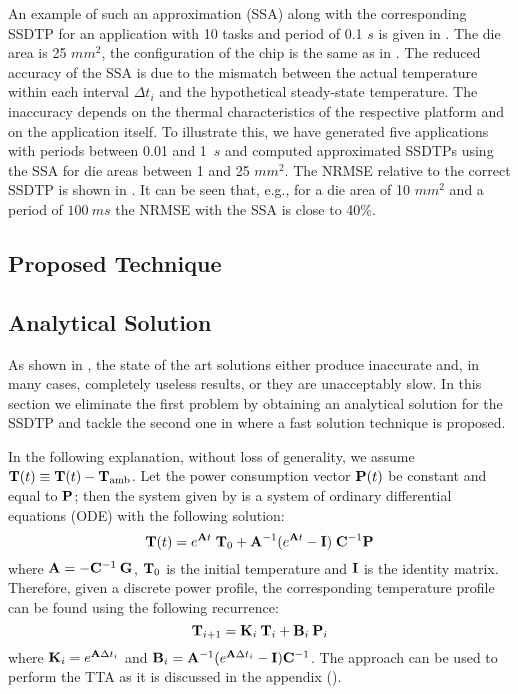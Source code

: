 An example of such an approximation (SSA) along with the corresponding SSDTP for
an application with 10 tasks and period of 0.1 $s$ is given in
. The die area is 25 $mm^2$, the configuration
of the chip is the same as in . The reduced accuracy of the SSA
is due to the mismatch between the actual temperature within each interval
$\Delta t_i$ and the hypothetical steady-state temperature. The inaccuracy
depends on the thermal characteristics of the respective platform and on the
application itself. To illustrate this, we have generated five applications with
periods between 0.01 and 1~$s$ and computed approximated SSDTPs using the SSA
for die areas between 1 and 25 $mm^2$. The NRMSE relative to the correct SSDTP
is shown in . It can be seen that, e.g., for a die area
of 10 $mm^2$ and a period of $100~ms$ the NRMSE with the SSA is close to 40\%.

\subsection{Proposed Technique} 

\subsection{Analytical Solution} 

As shown in , the state of the art solutions either
produce inaccurate and, in many cases, completely useless results, or they are
unacceptably slow. In this section we eliminate the first problem by obtaining
an analytical solution for the SSDTP and tackle the second one in
 where a fast solution technique is proposed.

In the following explanation, without loss of generality, we assume $\mathbf{T}(t)
\equiv \mathbf{T}(t) - \mathbf{T}_\text{amb}$. Let the power consumption vector $\mathbf{P}(t)$
be constant and equal to $\mathbf{P}$; then the system given by 
is a system of ordinary differential equations (ODE) with the following
solution:
\begin{equation} \elab{solution}
  \v{T}(t) = e^{\m{A} t} \; \v{T}_0 + \m{A}^{-1} (e^{\m{A} t} - \m{I}) \; \m{C}^{-1} \v{P}
\end{equation}
where $\mathbf{A} = -\mathbf{C}^{-1} \: \mathbf{G}$, $\mathbf{T}_0$ is the initial temperature and
$\mathbf{I}$ is the identity matrix. Therefore, given a discrete power profile, the
corresponding temperature profile can be found using the following recurrence:
\begin{equation} \elab{recurrent-system}
  \v{T}_{i+1} = \m{K}_i \: \v{T}_i + \m{B}_i \: \v{P}_i
\end{equation}
where $\mathbf{K}_i = e^{\mathbf{A} \Delta t_i}$ and $\mathbf{B}_i = \mathbf{A}^{-1}(e^{\mathbf{A} \Delta
t_i} - \mathbf{I})\mathbf{C}^{-1}$. The approach can be used to perform the TTA as it is
discussed in the appendix ().

